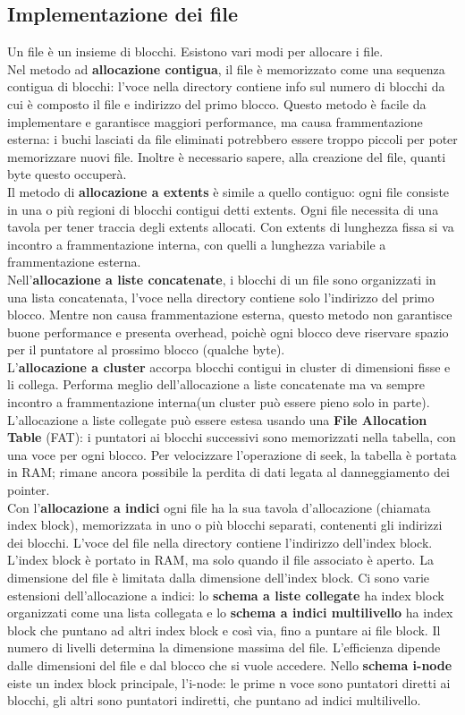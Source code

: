 \documentclass[12pt]{article}
\begin{document}
\subsection{Implementazione dei file}
Un file è un insieme di blocchi. Esistono vari modi per allocare i file.\\
Nel metodo ad \textbf{allocazione contigua}, il file è memorizzato come una sequenza contigua di blocchi: l'voce nella
directory contiene info sul numero di blocchi da cui è composto il file e indirizzo del primo blocco.
Questo metodo è facile da implementare e garantisce maggiori performance, ma causa frammentazione esterna: i buchi
lasciati da file eliminati potrebbero essere troppo piccoli per poter memorizzare nuovi file.
Inoltre è necessario sapere, alla creazione del file, quanti byte questo occuperà.\\
Il metodo di \textbf{allocazione a extents} è simile a quello contiguo: ogni file consiste in una o più regioni di 
blocchi contigui detti extents. Ogni file necessita di una tavola per tener traccia degli extents allocati. Con extents
di lunghezza fissa si va incontro a frammentazione interna, con quelli a lunghezza variabile a frammentazione esterna.\\
Nell'\textbf{allocazione a liste concatenate}, i blocchi di un file sono organizzati in una lista concatenata, l'voce 
nella directory contiene solo l'indirizzo del primo blocco.
Mentre non causa frammentazione esterna, questo metodo non garantisce buone performance e presenta overhead, poichè ogni
blocco deve riservare spazio per il puntatore al prossimo blocco (qualche byte).\\
L'\textbf{allocazione a cluster} accorpa blocchi contigui in cluster di dimensioni fisse e li collega. Performa meglio
dell'allocazione a liste concatenate ma va sempre incontro a frammentazione interna(un cluster può essere pieno solo in
parte).\\
L'allocazione a liste collegate può essere estesa usando una \textbf{File Allocation Table} (FAT): i puntatori ai
blocchi successivi sono memorizzati nella tabella, con una voce per ogni blocco. Per velocizzare l'operazione di seek, 
la tabella è portata in RAM; rimane ancora possibile la perdita di dati legata al danneggiamento dei pointer.\\
Con l'\textbf{allocazione a indici} ogni file ha la sua tavola d'allocazione (chiamata index block), memorizzata in uno
o più blocchi separati, contenenti gli indirizzi dei blocchi. L'voce del file nella directory contiene l'indirizzo 
dell'index block. L'index block è portato in RAM, ma solo quando il file associato è aperto. La dimensione del file è 
limitata dalla dimensione dell'index block.
Ci sono varie estensioni dell'allocazione a indici: lo \textbf{schema a liste collegate} ha index block organizzati come
una lista collegata e lo \textbf{schema a indici multilivello} ha index block che puntano ad altri index block e così 
via, fino a puntare ai file block. Il numero di livelli determina la dimensione massima del file.
L'efficienza dipende dalle dimensioni del file e dal blocco che si vuole accedere.
Nello \textbf{schema i-node} eiste un index block principale, l'i-node: le prime n voce sono puntatori diretti ai
blocchi, gli altri sono puntatori indiretti, che puntano ad indici multilivello.
\end{document}

